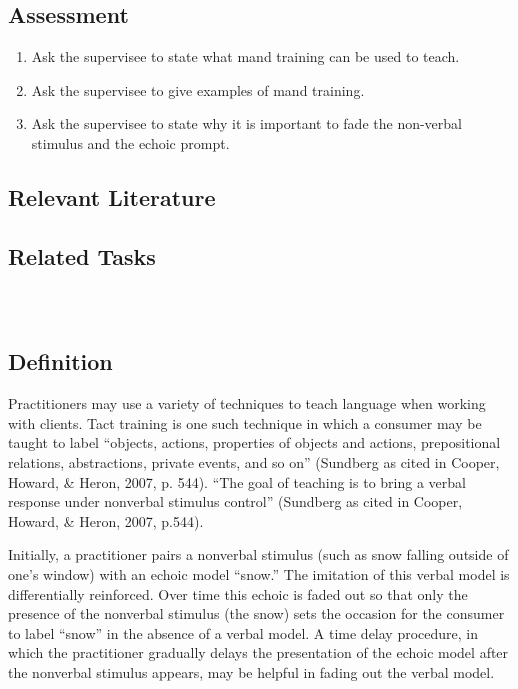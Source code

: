 \subsection{Assessment}
\begin{enumerate}
\item Ask the supervisee to state what mand training can be used to teach.
\item Ask the supervisee to give examples of mand training.
\item Ask the supervisee to state why it is important to fade the non-verbal stimulus and the echoic prompt.  
\end{enumerate}
%
\subsection{Relevant Literature}
\begin{refsection}
\nocite{cooper2007applied,
    drash1999using,
    skinner1957verbal,
    sundberg2002contriving,
    sundberg1998teaching}
\printbibliography[heading=none]
\end{refsection}
%
\subsection{Related Tasks}
\fourFKFourtyFour{}\\
%
%
%
%
%
%
%
%
%
%
%
%
\section{\fourdTwelve{}}
\subsection{Definition}
Practitioners may use a variety of techniques to teach language when working with clients.  Tact training is one such technique in which a consumer may be taught to label ``objects, actions, properties of objects and actions, prepositional relations, abstractions, private events, and so on''  (Sundberg as cited in Cooper, Howard, \& Heron, 2007, p. 544). ``The goal of teaching is to bring a verbal response under nonverbal stimulus control''  (Sundberg as cited in Cooper, Howard, \& Heron, 2007, p.544). 

Initially, a practitioner pairs a nonverbal stimulus (such as snow falling outside of one's window) with an echoic model ``snow.''  The imitation of this verbal model is differentially reinforced.  Over time this echoic is faded out so that only the presence of the nonverbal stimulus (the snow) sets the occasion for the consumer to label ``snow'' in the absence of a verbal model. A time delay procedure, in which the practitioner gradually delays the presentation of the echoic model after the nonverbal stimulus appears, may be helpful in fading out the verbal model.  

